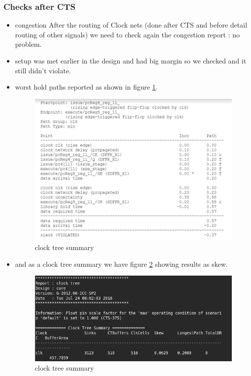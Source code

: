 \documentclass[../main.tex]{subfiles}
\begin{document}
\subsubsection{Checks after CTS }
\begin{itemize}
    \item congestion
    After the routing of Clock
nets (done after CTS and
before detail routing of
other signals) we need to
check again the congestion
report : no problem.
\item setup was met earlier in the design and had big margin so we checked and it still didn't violate. 
\item worst hold paths reported as shown in figure \ref{fig:holdviolation}.
\begin{figure}[h]
    \centering
    \includegraphics[width=13cm]{diagrams/holdviolation.JPG}
    \caption{clock tree summary}
    \label{fig:holdviolation}
\end{figure}

\newpage \item and as a clock tree summary we have figure \ref{fig:clocktreesummary} showing results as skew.
\begin{figure}[h]
    \centering
    \includegraphics[width=13cm]{diagrams/clk_tree_summary.png}
    \caption{clock tree summary}
    \label{fig:clocktreesummary}
\end{figure}
\end{itemize}
\end{document}
